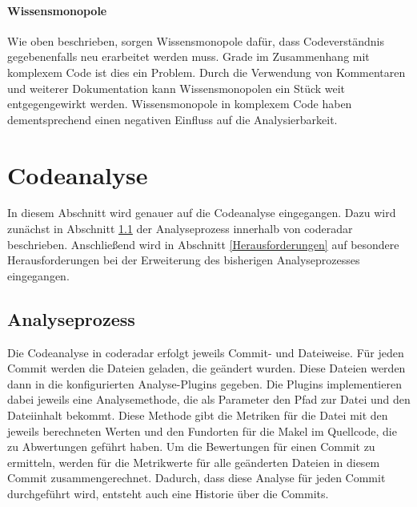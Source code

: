 \documentclass[
	oneside,  %
	ngerman, 
	final, 
	11pt, 
	a4paper, 
	1.1headlines, 
	headinclude=false, 
	footinclude=false, 
	mpinclude=false, 
	pagesize, 
	onecolumn, 
	titlepage, 
	parskip=half, 
	headsepline, 
	chapterprefix=false, 
	version=first, 
	listof=totoc, 
	bibliography=totoc, 
	toc=graduated, 
	fleqn
]{scrbook}
\begin{document}
\paragraph{Wissensmonopole}
Wie oben beschrieben, sorgen Wissensmonopole dafür, dass Codeverständnis gegebenenfalls neu erarbeitet werden muss.
Grade im Zusammenhang mit komplexem Code ist dies ein Problem.
Durch die Verwendung von Kommentaren und weiterer Dokumentation kann Wissensmonopolen ein Stück weit entgegengewirkt werden.
Wissensmonopole in komplexem Code haben dementsprechend einen negativen Einfluss auf die Analysierbarkeit.

\section{Codeanalyse}
\label{Codeanalyse}
In diesem Abschnitt wird genauer auf die Codeanalyse eingegangen.
Dazu wird zunächst in Abschnitt \ref{Analyseprozess} der Analyseprozess innerhalb von coderadar beschrieben.
Anschließend wird in Abschnitt \ref{Herausforderungen} auf besondere Herausforderungen bei der Erweiterung des bisherigen Analyseprozesses eingegangen.

\subsection{Analyseprozess}
\label{Analyseprozess}
Die Codeanalyse in coderadar erfolgt jeweils Commit- und Dateiweise.
Für jeden Commit werden die Dateien geladen, die geändert wurden.
Diese Dateien werden dann in die konfigurierten Analyse-Plugins gegeben.
Die Plugins implementieren dabei jeweils eine Analysemethode, die als Parameter den Pfad zur Datei und den Dateiinhalt bekommt.
Diese Methode gibt die Metriken für die Datei mit den jeweils berechneten Werten und den Fundorten für die Makel im Quellcode, die zu Abwertungen geführt haben.
Um die Bewertungen für einen Commit zu ermitteln, werden für die Metrikwerte für alle geänderten Dateien in diesem Commit zusammengerechnet.
Dadurch, dass diese Analyse für jeden Commit durchgeführt wird, entsteht auch eine Historie über die Commits.
\end{document}
